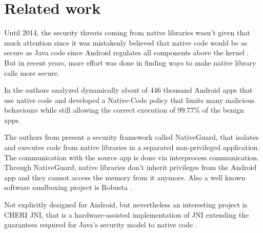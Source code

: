 
\section{Related work}

Until 2014, the security threats coming from native libraries wasn't given that much attention since it was mistakenly believed that native code would be as secure as Java code since Android regulates all components above the kernel \cite[p. 1]{Sun:2014:NPA:2627393.2627396}. \\
But in recent years, more effort was done in finding ways to make native library calls more secure.

In \cite{Afonso2016GoingNU} the authors analyzed dynamically about of 446 thousand Android apps that use native code and developed a Native-Code policy that limits many malicious behaviours while still allowing the correct execution of 99.77\% of the benign apps.

The authors from \cite{Sun:2014:NPA:2627393.2627396} present a security framework called NativeGuard, that isolates and executes code from native libraries in a separated non-privileged application. The communication with the source app is done via interprocess communication. Through NativeGuard, native libraries don't inherit privileges from the Android app and they cannot access the memory from it anymore.  
Also a well known software sandboxing project is Robusta \cite{Siefers:2010:RTN:1866307.1866331}. %

Not explicitly designed for Android, but nevertheless an interesting project is CHERI JNI, that is a hardware-assisted implementation of JNI extending the guarantees required for Java's security model to native code \cite{Chisnall:2017:CJS:3093337.3037725}.

